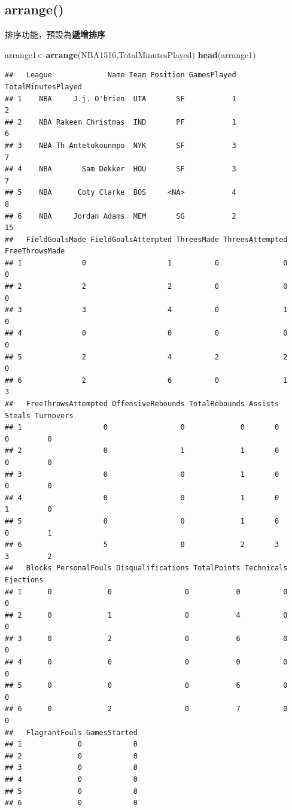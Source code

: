 \documentclass[]{book}
\newenvironment{Shaded}{\begin{snugshade}}{\end{snugshade}}
\newcommand{\KeywordTok}[1]{\textcolor[rgb]{0.13,0.29,0.53}{\textbf{{#1}}}}
\newcommand{\NormalTok}[1]{{#1}}
\theoremstyle{definition}
\theoremstyle{definition}
\theoremstyle{remark}
\begin{document}
\subsection{arrange()}\label{arrange}

排序功能，預設為\textbf{遞增排序}

\begin{Shaded}
\begin{Highlighting}[]
\NormalTok{arrange1<-}\KeywordTok{arrange}\NormalTok{(NBA1516,TotalMinutesPlayed)}
\KeywordTok{head}\NormalTok{(arrange1)}
\end{Highlighting}
\end{Shaded}

\begin{verbatim}
##   League             Name Team Position GamesPlayed TotalMinutesPlayed
## 1    NBA     J.j. O'brien  UTA       SF           1                  2
## 2    NBA Rakeem Christmas  IND       PF           1                  6
## 3    NBA Th Antetokounmpo  NYK       SF           3                  7
## 4    NBA       Sam Dekker  HOU       SF           3                  7
## 5    NBA      Coty Clarke  BOS     <NA>           4                  8
## 6    NBA     Jordan Adams  MEM       SG           2                 15
##   FieldGoalsMade FieldGoalsAttempted ThreesMade ThreesAttempted FreeThrowsMade
## 1              0                   1          0               0              0
## 2              2                   2          0               0              0
## 3              3                   4          0               1              0
## 4              0                   0          0               0              0
## 5              2                   4          2               2              0
## 6              2                   6          0               1              3
##   FreeThrowsAttempted OffensiveRebounds TotalRebounds Assists Steals Turnovers
## 1                   0                 0             0       0      0         0
## 2                   0                 1             1       0      0         0
## 3                   0                 0             1       0      0         0
## 4                   0                 0             1       0      1         0
## 5                   0                 0             1       0      0         1
## 6                   5                 0             2       3      3         2
##   Blocks PersonalFouls Disqualifications TotalPoints Technicals Ejections
## 1      0             0                 0           0          0         0
## 2      0             1                 0           4          0         0
## 3      0             2                 0           6          0         0
## 4      0             0                 0           0          0         0
## 5      0             0                 0           6          0         0
## 6      0             2                 0           7          0         0
##   FlagrantFouls GamesStarted
## 1             0            0
## 2             0            0
## 3             0            0
## 4             0            0
## 5             0            0
## 6             0            0
\end{verbatim}
\end{document}
